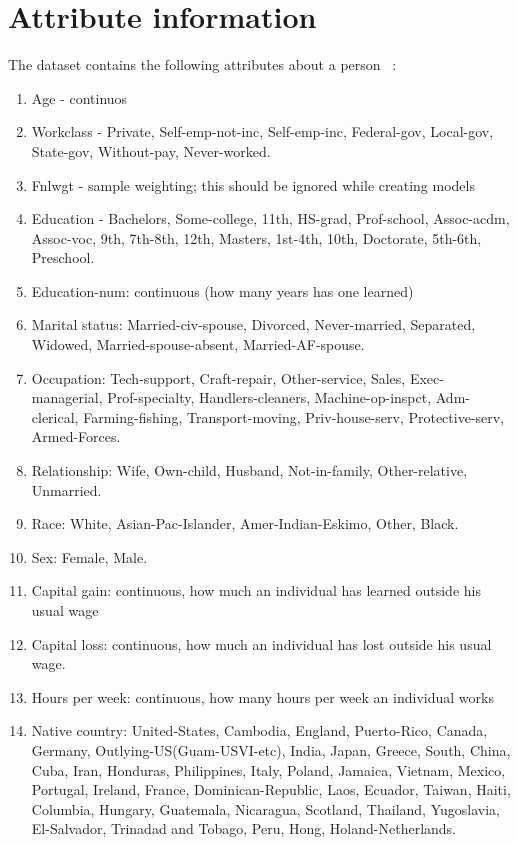 \section{Attribute information}
The dataset contains the following attributes about a person ~\cite{uci-link}:
\begin{enumerate}
    \item Age - continuos
    \item Workclass - Private, Self-emp-not-inc, Self-emp-inc, Federal-gov, Local-gov, State-gov, Without-pay, Never-worked.
    \item Fnlwgt - sample weighting; this should be ignored while creating models
    \item Education - Bachelors, Some-college, 11th, HS-grad, Prof-school, Assoc-acdm, Assoc-voc, 9th, 7th-8th, 12th, Masters, 1st-4th, 10th, Doctorate, 5th-6th, Preschool. 
    \item Education-num: continuous (how many years has one learned)
    \item Marital status: Married-civ-spouse, Divorced, Never-married, Separated, Widowed, Married-spouse-absent, Married-AF-spouse. 
    \item Occupation: Tech-support, Craft-repair, Other-service, Sales, Exec-managerial, Prof-specialty, Handlers-cleaners, Machine-op-inspct, Adm-clerical, Farming-fishing, Transport-moving, Priv-house-serv, Protective-serv, Armed-Forces.
    \item Relationship: Wife, Own-child, Husband, Not-in-family, Other-relative, Unmarried. 
    \item Race: White, Asian-Pac-Islander, Amer-Indian-Eskimo, Other, Black. 
    \item Sex: Female, Male. 
    \item Capital gain: continuous, how much an individual has learned outside his usual wage
    \item Capital loss: continuous, how much an individual has lost outside his usual wage.
    \item Hours per week: continuous, how many hours per week an individual works
    \item Native country: United-States, Cambodia, England, Puerto-Rico, Canada, Germany, Outlying-US(Guam-USVI-etc), India, Japan, Greece, South, China, Cuba, Iran, Honduras, Philippines, Italy, Poland, Jamaica, Vietnam, Mexico, Portugal, Ireland, France, Dominican-Republic, Laos, Ecuador, Taiwan, Haiti, Columbia, Hungary, Guatemala, Nicaragua, Scotland, Thailand, Yugoslavia, El-Salvador, Trinadad and Tobago, Peru, Hong, Holand-Netherlands.
\end{enumerate}
